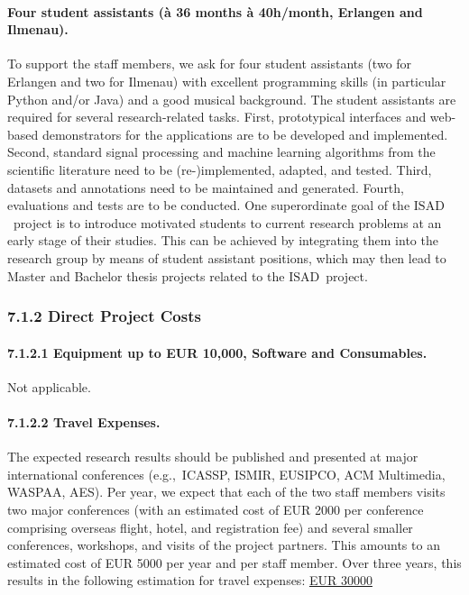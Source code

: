 \documentclass[11pt,a4paper]{article}
\def\PN{\mathrm{ISAD}}
\newcommand{\egc}{e.g.,\ }
\theoremstyle{plain} \newtheorem{define}{Definition}[section]
\begin{document}
{\paragraph*{Four student assistants (\`a 36 months \`a 40h/month, Erlangen and Ilmenau).}
To support the staff members, we ask for four student assistants (two for Erlangen and two for Ilmenau) with excellent
programming skills (in particular Python and/or Java) and a good musical background. 
%
The student assistants are required for several research-related tasks.
First, prototypical interfaces and web-based demonstrators for the applications are to be developed and implemented.
Second, standard signal processing and machine learning algorithms from the scientific literature
need to be (re-)implemented, adapted, and tested.
Third, datasets and annotations need to be maintained and generated.
Fourth, evaluations and tests are to be conducted.
%
One superordinate goal of the $\PN$~project is to introduce motivated students to current research problems at an early stage of their studies. This can be achieved by integrating them into the research group by means of student assistant positions, which may then lead to Master and Bachelor thesis projects related to the $\PN$~project.


\subsubsection*{7.1.2 Direct Project Costs}

\paragraph*{7.1.2.1	Equipment up to EUR 10,000, Software and Consumables.}
%
Not applicable.
\vspace{-0.4cm}


\paragraph*{7.1.2.2	Travel Expenses.}
%
The expected research results should be published and presented at major international conferences (\egc ICASSP, ISMIR, EUSIPCO, ACM Multimedia, WASPAA, AES). Per year, we expect that each of the two staff members visits two major conferences (with an estimated cost of EUR 2000 per conference comprising overseas flight, hotel, and registration fee) and several smaller conferences, workshops, and visits of the project partners. This amounts to an estimated cost of EUR 5000 per year and per staff member. Over three years, this results in the following estimation for travel expenses:
\hfill{\underline{EUR 30000}}\\
%
\vspace{-0.4cm}

}
\end{document}

